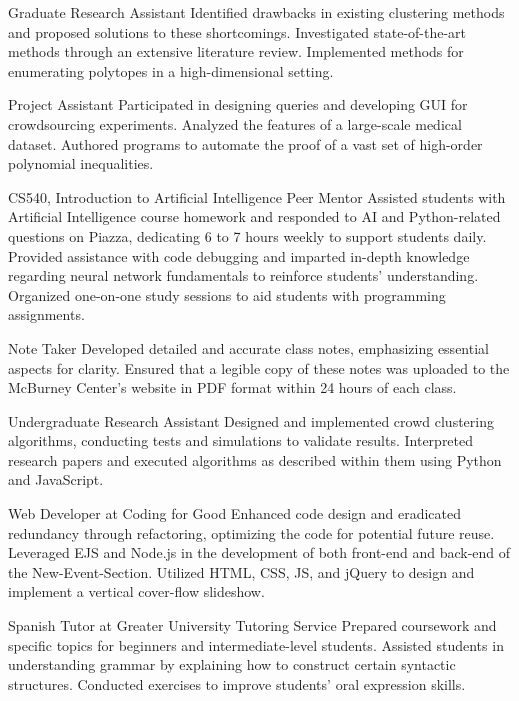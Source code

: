 \documentclass[11pt,letterpaper]{report}
\begin{document}
    \begin{tablist}

    \item[Graduate Research Assistant] \tab{}
        Identified drawbacks in existing clustering methods and proposed solutions to these shortcomings. Investigated state-of-the-art methods through an extensive literature review. Implemented methods for enumerating polytopes in a high-dimensional setting.
    \item[Project Assistant] \tab{} \newline
        Participated in designing queries and developing GUI for crowdsourcing experiments. Analyzed the features of a large-scale medical dataset. Authored programs to automate the proof of a vast set of high-order polynomial inequalities.
    \item[CS540, Introduction to Artificial Intelligence Peer Mentor] \tab{}
        Assisted students with Artificial Intelligence course homework and responded to AI and Python-related questions on Piazza, dedicating 6 to 7 hours weekly to support students daily. Provided assistance with code debugging and imparted in-depth knowledge regarding neural network fundamentals to reinforce students' understanding. Organized one-on-one study sessions to aid students with programming assignments.
    \item[Note Taker] \tab{} \newline
      Developed detailed and accurate class notes, emphasizing essential aspects for clarity. Ensured that a legible copy of these notes was uploaded to the McBurney Center’s website in PDF format within 24 hours of each class.
    \item[Undergraduate Research Assistant] \tab{}
      Designed and implemented crowd clustering algorithms, conducting tests and simulations to validate results. Interpreted research papers and executed algorithms as described within them using Python and JavaScript.
    \item[Web Developer at Coding for Good] \tab{}
      Enhanced code design and eradicated redundancy through refactoring, optimizing the code for potential future reuse. Leveraged EJS and Node.js in the development of both front-end and back-end of the New-Event-Section. Utilized HTML, CSS, JS, and jQuery to design and implement a vertical cover-flow slideshow.
    \item[Spanish Tutor at Greater University Tutoring Service] \tab{}
      Prepared coursework and specific topics for beginners and intermediate-level students. Assisted students in understanding grammar by explaining how to construct certain syntactic structures. Conducted exercises to improve students' oral expression skills.
    \end{tablist}
\end{document}
